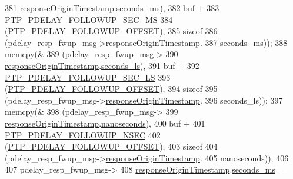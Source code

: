 \begin{DoxyCode}
{{{{{{{{381                 \hyperlink{class_p_t_p_message_path_delay_resp_follow_up_ace95ddb3f03eb3b4fcf8f73281dc0ee3}{responseOriginTimestamp}.\hyperlink{class_timestamp_a5d98378d782519e6f9c17db70f1620f0}{seconds\_ms}),
382                    buf +
383                    \hyperlink{avbts__message_8hpp_a64120f45af2cdc57df2a73e8867ec2dd}{PTP\_PDELAY\_FOLLOWUP\_SEC\_MS}
384                    (\hyperlink{avbts__message_8hpp_af0f41aa83b1011ea5b8c42abddd8cd50}{PTP\_PDELAY\_FOLLOWUP\_OFFSET}),
385                    \textcolor{keyword}{sizeof}
386                    (pdelay\_resp\_fwup\_msg->\hyperlink{class_p_t_p_message_path_delay_resp_follow_up_ace95ddb3f03eb3b4fcf8f73281dc0ee3}{responseOriginTimestamp}.
387                 seconds\_ms));
388             memcpy(&
389                    (pdelay\_resp\_fwup\_msg->
390                 \hyperlink{class_p_t_p_message_path_delay_resp_follow_up_ace95ddb3f03eb3b4fcf8f73281dc0ee3}{responseOriginTimestamp}.\hyperlink{class_timestamp_a2bf200e58cd268d8b86cf93c51500a44}{seconds\_ls}),
391                    buf +
392                    \hyperlink{avbts__message_8hpp_a9a1f675eb7706c235c9d3bb050683da2}{PTP\_PDELAY\_FOLLOWUP\_SEC\_LS}
393                    (\hyperlink{avbts__message_8hpp_af0f41aa83b1011ea5b8c42abddd8cd50}{PTP\_PDELAY\_FOLLOWUP\_OFFSET}),
394                    \textcolor{keyword}{sizeof}
395                    (pdelay\_resp\_fwup\_msg->\hyperlink{class_p_t_p_message_path_delay_resp_follow_up_ace95ddb3f03eb3b4fcf8f73281dc0ee3}{responseOriginTimestamp}.
396                 seconds\_ls));
397             memcpy(&
398                    (pdelay\_resp\_fwup\_msg->
399                 \hyperlink{class_p_t_p_message_path_delay_resp_follow_up_ace95ddb3f03eb3b4fcf8f73281dc0ee3}{responseOriginTimestamp}.\hyperlink{class_timestamp_a78ae11d98fcfe738239d0a853d82c84a}{nanoseconds}),
400                    buf +
401                    \hyperlink{avbts__message_8hpp_a405e85b9d79337d889c22e4b7959aa84}{PTP\_PDELAY\_FOLLOWUP\_NSEC}
402                    (\hyperlink{avbts__message_8hpp_af0f41aa83b1011ea5b8c42abddd8cd50}{PTP\_PDELAY\_FOLLOWUP\_OFFSET}),
403                    \textcolor{keyword}{sizeof}
404                    (pdelay\_resp\_fwup\_msg->\hyperlink{class_p_t_p_message_path_delay_resp_follow_up_ace95ddb3f03eb3b4fcf8f73281dc0ee3}{responseOriginTimestamp}.
405                 nanoseconds));
406 
407             pdelay\_resp\_fwup\_msg->
408                 \hyperlink{class_p_t_p_message_path_delay_resp_follow_up_ace95ddb3f03eb3b4fcf8f73281dc0ee3}{responseOriginTimestamp}.\hyperlink{class_timestamp_a5d98378d782519e6f9c17db70f1620f0}{seconds\_ms} =
}}}}}}}}
\end{DoxyCode}
